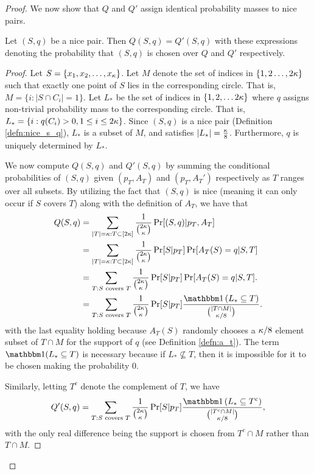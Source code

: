 \begin{proof}
We now show that $Q$ and $Q'$ assign identical probability masses to nice pairs. 

\begin{lemma}\label{lem:probability_is_same}
Let $(S, q)$ be a nice pair. Then $Q(S, q) = Q'(S, q)$ with these expressions denoting the probability that $(S,q)$ is chosen over $Q$ and $Q'$ respectively. 
\end{lemma}

\begin{proof}
Let $S = \{x_1, x_2, \dots, x_\kappa\}$. Let $M$ denote the set of indices in $\{1, 2 \dots, 2\kappa\}$ such that exactly one point of $S$ lies in the corresponding circle. That is, $M = \{i: |S \cap C_i| = 1\}$. Let $L_*$ be the set of indices in $\{1, 2, \dots 2\kappa\}$ where $q$ assigns non-trivial probability mass to the corresponding circle. That is, $L_* = \{i: q(C_i) > 0, 1 \leq i\leq 2\kappa\}$. Since $(S, q)$ is a nice pair (Definition \ref{defn:nice_s_q}), $L_*$ is a subset of $M$, and satisfies $|L_*| = \frac{\kappa}{8}$. Furthermore, $q$ is uniquely determined by $L_*$.


We now compute $Q(S, q)$ and $Q'(S, q)$ by summing the conditional probabilities of $(S,q)$ given $(p_T, A_T)$ and $(p_T, A_T')$ respectively as $T$ ranges over all subsets. By utilizing the fact that $(S, q)$ is nice (meaning it can only occur if $S$ covers $T$) along with the definition of $A_T$, we have that
\begin{equation*}
\begin{split}
Q(S, q) &= \sum_{|T| = \a: T \subset [2\a]} \frac{1}{\binom{2\a}{\a}}\Pr[(S, q) | p_T, A_T] \\
&= \sum_{|T| = \a: T \subset [2\a]} \frac{1}{\binom{2\a}{\a}} \Pr[S|p_T]\Pr[A_T(S) = q|S, T] \\
&= \sum_{T: S\text{ covers }T} \frac{1}{\binom{2\a}{\a}}\Pr[S|p_T]\Pr[A_T(S) = q|S, T]. \\
&= \sum_{T: S\text{ covers }T} \frac{1}{\binom{2\a}{\a}}\Pr[S|p_T]\frac{\ind\left(L_* \subseteq T\right)}{\binom{|T \cap M|}{\a/8}}.
\end{split}
\end{equation*} 
with the last equality holding because $A_T(S)$ randomly chooses a $\kappa/8$ element subset of $T \cap M$ for the support of $q$ (see Definition \ref{defn:a_t}). The term $\ind(L_* \subseteq T)$ is necessary because if $L_* \not \subseteq T$, then it is impossible for it to be chosen making the probability $0$. 

Similarly, letting $T^c$ denote the complement of $T$, we have
\begin{equation*}
Q'(S, q) = \sum_{T: S\text{ covers }T} \frac{1}{\binom{2\a}{\a}}\Pr[S|p_T]\frac{\ind\left(L_* \subseteq T^c \right)}{\binom{|T^c \cap M|}{\a/8}},
\end{equation*}
with the only real difference being the support is chosen from $T^c \cap M$ rather than $T \cap M$. 


\end{proof}
\end{proof}

